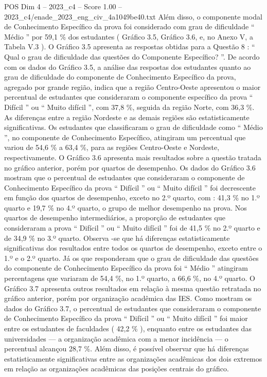 \begin{textsample}{POS Dim 4 – 2023\_c4 – Score 1.00 – 2023\_c4/enade\_2023\_eng\_civ\_4a1049be40.txt}
Além disso, o componente modal de Conhecimento Específico da prova foi considerado com grau de dificuldade “ Médio ” por 59,1 \% dos estudantes ( Gráfico 3.5, Gráfico 3.6, e, no Anexo V, a Tabela V.3 ).
O Gráfico 3.5 apresenta as respostas obtidas para a Questão 8 : “ Qual o grau de dificuldade das questões do Componente Específico? ”.
De acordo com os dados do Gráfico 3.5, a análise das respostas dos estudantes quanto ao grau de dificuldade do componente de Conhecimento Específico da prova, agregado por grande região, indica que a região Centro-Oeste apresentou o maior percentual de estudantes que consideraram o componente específico da prova “ Difícil ” ou “ Muito difícil ”, com 37,8 \%, seguida da região Norte, com 36,3 \%.
As diferenças entre a região Nordeste e as demais regiões são estatisticamente significativas.
Os estudantes que classificaram o grau de dificuldade como “ Médio ”, no componente de Conhecimento Específico, atingiram um percentual que variou de 54,6 \% a 63,4 \%, para as regiões Centro-Oeste e Nordeste, respectivamente.
O Gráfico 3.6 apresenta mais resultados sobre a questão tratada no gráfico anterior, porém por quartos de desempenho.
Os dados do Gráfico 3.6 mostram que o percentual de estudantes que consideraram o componente de Conhecimento Específico da prova “ Difícil ” ou “ Muito difícil ” foi decrescente em função dos quartos de desempenho, exceto no 2.º quarto, com : 41,3 \% no 1.º quarto e 19,7 \% no 4.º quarto, o grupo de melhor desempenho na prova.
Nos quartos de desempenho intermediários, a proporção de estudantes que consideraram a prova “ Difícil ” ou “ Muito difícil ” foi de 41,5 \% no 2.º quarto e de 34,9 \% no 3.º quarto.
Observa -se que há diferenças estatisticamente significativas dos resultados entre todos os quartos de desempenho, exceto entre o 1.º e o 2.º quarto.
Já os que responderam que o grau de dificuldade das questões do componente de Conhecimento Específico da prova foi “ Médio ” atingiram percentagens que variaram de 54,4 \%, no 1.º quarto, a 66,6 \%, no 4.º quarto.
O Gráfico 3.7 apresenta outros resultados em relação à mesma questão retratada no gráfico anterior, porém por organização acadêmica das IES.
Como mostram os dados do Gráfico 3.7, o percentual de estudantes que consideraram o componente de Conhecimento Específico da prova “ Difícil ” ou “ Muito difícil ” foi maior entre os estudantes de faculdades ( 42,2 \% ), enquanto entre os estudantes das universidades — a organização acadêmica com a menor incidência — o percentual alcançou 28,7 \%.
Além disso, é possível observar que há diferenças estatisticamente significativas entre as organizações acadêmicas dos dois extremos em relação as organizações acadêmicas das posições centrais do gráfico.

\end{textsample}

